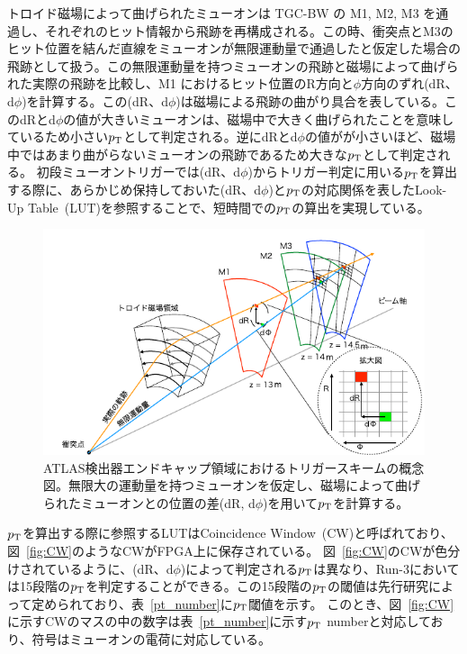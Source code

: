 トロイド磁場によって曲げられたミューオンは TGC-BW の M1, M2, M3 を通過し、それぞれのヒット情報から飛跡を再構成される。この時、衝突点とM3のヒット位置を結んだ直線をミューオンが無限運動量で通過したと仮定した場合の飛跡として扱う。この無限運動量を持つミューオンの飛跡と磁場によって曲げられた実際の飛跡を比較し、M1 におけるヒット位置のR方向と$\phi$方向のずれ(dR、d$\phi$)を計算する。この(dR、d$\phi$)は磁場による飛跡の曲がり具合を表している。このdRとd$\phi$の値が大きいミューオンは、磁場中で大きく曲げられたことを意味しているため小さい$p_{\rm{T}}$として判定される。逆にdRとd$\phi$の値がが小さいほど、磁場中ではあまり曲がらないミューオンの飛跡であるため大きな$p_{\rm{T}}$として判定される。
初段ミューオントリガーでは(dR、d$\phi$)からトリガー判定に用いる$p_{\rm{T}}$を算出する際に、あらかじめ保持しておいた(dR、d$\phi$)と$p_{\rm{T}}$の対応関係を表したLook-Up Table~(LUT)を参照することで、短時間での$p_{\rm{T}}$の算出を実現している。

\begin{figure}[tb]
  \centering
  \includegraphics[clip, width=15cm]{fig/3/akatuka_mt_trigger_sceme.pdf}
  \caption{ATLAS検出器エンドキャップ領域におけるトリガースキームの概念図\cite{article:akatsuka-mron}。無限大の運動量を持つミューオンを仮定し、磁場によって曲げられたミューオンとの位置の差(dR, d$\phi$)を用いて$p_{\rm{T}}$を計算する。}
  \label{fig:trigger-scheme}
\end{figure}


$p_{\rm{T}}$を算出する際に参照するLUTはCoincidence Window~(CW)と呼ばれており、図~\ref{fig:CW}のようなCWがFPGA上に保存されている。
図~\ref{fig:CW}のCWが色分けされているように、(dR、d$\phi$)によって判定される$p_{\rm{T}}$は異なり、Run-3においては15段階の$p_{\rm{T}}$を判定することができる。この15段階の$p_{\rm{T}}$の閾値は先行研究\cite{article:shiomi-mron}によって定められており、表~\ref{pt_number}に$p_{\rm{T}}$閾値を示す。
このとき、図~\ref{fig:CW}に示すCWのマスの中の数字は表~\ref{pt_number}に示す$p_{\rm{T}}$ numberと対応しており、符号はミューオンの電荷に対応している。

